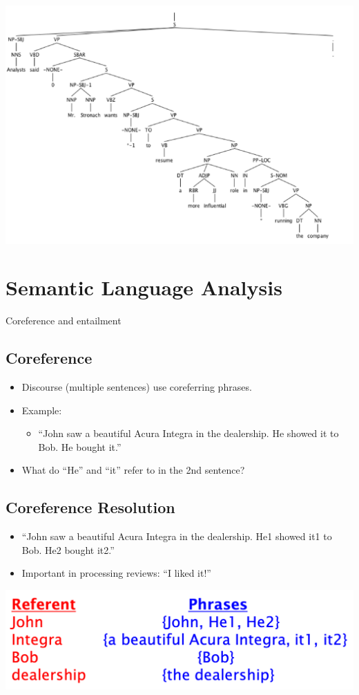 \documentclass[11pt]{article}
\theoremstyle{definition}
\begin{document}
\includegraphics[width=\textwidth]{3.png}

\section{Semantic
Language Analysis}
Coreference and
entailment

\subsection{Coreference}
\begin{itemize}
  \item Discourse (multiple sentences) use coreferring phrases.
  \item Example:
  \begin{itemize}
    \item “John saw a beautiful Acura Integra in the dealership.
    He showed it to Bob.
    He bought it.”
  \end{itemize}
  \item What do “He” and “it” refer to in the 2nd sentence?
\end{itemize}

\subsection{Coreference Resolution}
\begin{itemize}
  \item “John saw a beautiful Acura Integra in the dealership.
  He1 showed it1 to Bob.
  He2 bought it2.”
  \item Important in processing reviews: “I liked it!”
\end{itemize}
\includegraphics[width=\textwidth/2]{4.png}
\end{document}
